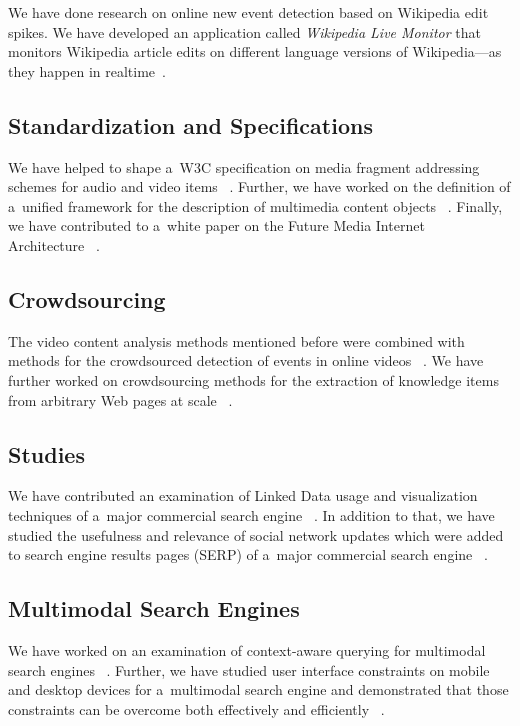 We have done research on online new event detection
based on Wikipedia edit spikes.
We have developed an application called \emph{Wikipedia Live Monitor}
that monitors Wikipedia article edits on different language versions
of Wikipedia---as they happen in realtime~\cite{steiner2013mj}.

\subsection{Standardization and Specifications}

We have helped to shape a~W3C specification on media
fragment addressing schemes for audio and video items~%
\cite{troncy2012mediafragments}.
Further, we have worked on the definition of a~unified framework
for the description of multimedia content objects~%
\cite{axenopoulos2012isearch,daras2011unifiedframework}.
Finally, we have contributed to a~white paper on the
Future Media Internet Architecture~%
\cite{alduan2011futureinternet}.

\subsection{Crowdsourcing}

The video content analysis methods mentioned before
were combined with methods for the crowdsourced detection
of events in online videos~%
\cite{steiner2011crowdsourcingevent}.
We have further worked on crowdsourcing methods
for the extraction of knowledge items from arbitrary Web pages at scale~%
\cite{steiner2012sekiathome,steiner2012sekiathomechallenge}.

\subsection{Studies}

We have contributed an examination of Linked Data usage and
visualization techniques of a~major commercial search engine~%
\cite{steiner2010howgoogleisusing}.
In addition to that, we have studied the usefulness and relevance
of social network updates which were added to search engine
results pages (SERP) of a~major commercial search engine~%
\cite{steiner2012addingrealtime}.

\subsection{Multimodal Search Engines}

We have worked on an examination of context-aware querying
for multimodal search engines~%
\cite{etzold2012contextawarequerying,steiner2012isearch}.
Further, we have studied user interface constraints on
mobile and desktop devices for a~multimodal search engine
and demonstrated that those constraints can be overcome
both effectively and efficiently~%
\cite{steiner2012onesizedoesnotfitall}.

